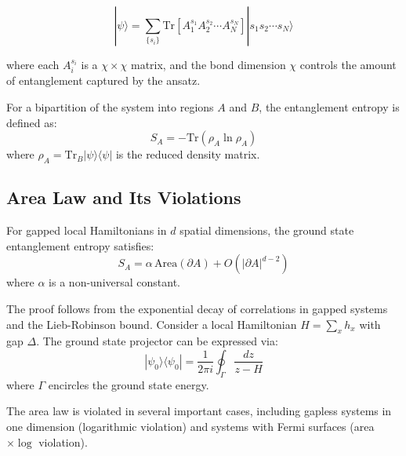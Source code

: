 \documentclass[paper]{academic-report}
\begin{document}
\begin{equation}
  |\psi\rangle = \sum_{\{s_i\}} \mathrm{Tr}\left[A_1^{s_1} A_2^{s_2} \cdots A_N^{s_N}\right] |s_1 s_2 \cdots s_N\rangle
  \label{eq:mps}
\end{equation}

where each $A_i^{s_i}$ is a $\chi \times \chi$ matrix, and the bond dimension
$\chi$ controls the amount of entanglement captured by the ansatz.

\begin{definitionblock}
For a bipartition of the system into regions $A$ and $B$, the entanglement
entropy is defined as:
\begin{equation}
  S_A = -\mathrm{Tr}(\rho_A \ln \rho_A)
  \label{eq:entanglement}
\end{equation}
where $\rho_A = \mathrm{Tr}_B|\psi\rangle\langle\psi|$ is the reduced density
matrix.
\end{definitionblock}

\subsection{Area Law and Its Violations}

\begin{theoremblock}
For gapped local Hamiltonians in $d$ spatial dimensions, the ground state
entanglement entropy satisfies:
\begin{equation}
  S_A = \alpha\, \mathrm{Area}(\partial A) + O(|\partial A|^{d-2})
  \label{eq:arealaw}
\end{equation}
where $\alpha$ is a non-universal constant.
\end{theoremblock}

\begin{proofblock}
The proof follows from the exponential decay of correlations in gapped systems
and the Lieb-Robinson bound. Consider a local Hamiltonian $H = \sum_x h_x$ with
gap $\Delta$. The ground state projector can be expressed via:
\begin{equation}
  |\psi_0\rangle\langle\psi_0| = \frac{1}{2\pi i} \oint_\Gamma \frac{dz}{z - H}
\end{equation}
where $\Gamma$ encircles the ground state energy.
\end{proofblock}

\begin{remarkblock}
The area law is violated in several important cases, including gapless systems
in one dimension (logarithmic violation) and systems with Fermi surfaces
(area $\times \log$ violation).
\end{remarkblock}
\end{document}

